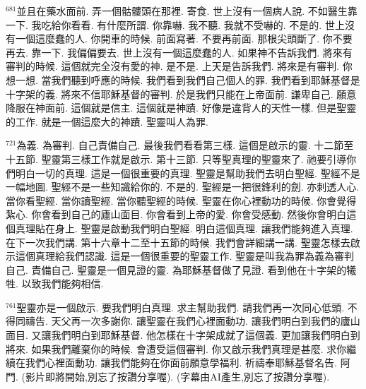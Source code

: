 \documentclass{book}
\begin{document}
$^{681}$並且在藥水面前.
弄一個骷髏頭在那裡.
寄食.
世上沒有一個病人說.
不如醫生靠一下.
我吃給你看看.
有什麼所謂.
你靠嚇.
我不聽.
我就不受嚇的.
不是的.
世上沒有一個這麼蠢的人.
你開車的時候.
前面寫著.
不要再前面.
那根尖頭斷了.
你不要再去.
靠一下.
我偏偏要去.
世上沒有一個這麼蠢的人.
如果神不告訴我們.
將來有審判的時候.
這個就完全沒有愛的神.
是不是.
上天是告訴我們.
將來是有審判.
你想一想.
當我們聽到呼應的時候.
我們看到我們自己個人的罪.
我們看到耶穌基督是十字架的義.
將來不信耶穌基督的審判.
於是我們只能在上帝面前.
謙卑自己.
願意降服在神面前.
這個就是信主.
這個就是神蹟.
好像是違背人的天性一樣.
但是聖靈的工作.
就是一個這麼大的神蹟.
聖靈叫人為罪.

$^{721}$為義.
為審判.
自己責備自己.
最後我們看看第三樣.
這個是啟示的靈.
十二節至十五節.
聖靈第三樣工作就是啟示.
第十三節.
只等聖真理的聖靈來了.
祂要引導你們明白一切的真理.
這是一個很重要的真理.
聖靈是幫助我們去明白聖經.
聖經不是一幅地圖.
聖經不是一些知識給你的.
不是的.
聖經是一把很鋒利的劍.
亦刺透人心.
當你看聖經.
當你讀聖經.
當你聽聖經的時候.
聖靈在你心裡動功的時候.
你會覺得紮心.
你會看到自己的廬山面目.
你會看到上帝的愛.
你會受感動.
然後你會明白這個真理貼在身上.
聖靈是啟動我們明白聖經.
明白這個真理.
讓我們能夠進入真理.
在下一次我們講.
第十六章十二至十五節的時候.
我們會詳細講一講.
聖靈怎樣去啟示這個真理給我們認識.
這是一個很重要的聖靈工作.
聖靈是叫我為罪為義為審判自己.
責備自己.
聖靈是一個見證的靈.
為耶穌基督做了見證.
看到他在十字架的犧牲.
以致我們能夠相信.

$^{761}$聖靈亦是一個啟示.
要我們明白真理.
求主幫助我們.
請我們再一次同心低頭.
不得同禱告.
天父再一次多謝你.
讓聖靈在我們心裡面動功.
讓我們明白到我們的廬山面目.
又讓我們明白到耶穌基督.
他怎樣在十字架成就了這個義.
更加讓我們明白到將來.
如果我們離棄你的時候.
會遭受這個審判.
你又啟示我們真理是甚麼.
求你繼續在我們心裡面動功.
讓我們能夠在你面前願意學福利.
祈禱奉耶穌基督名告.
阿門.
(影片即將開始,別忘了按讚分享喔).
(字幕由AI產生,別忘了按讚分享喔).
\newpage
\end{document}
